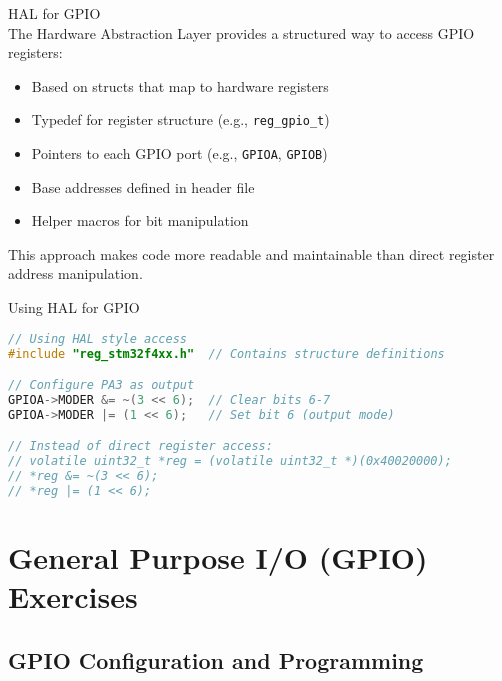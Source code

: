 \begin{concept}{HAL for GPIO}\\
The Hardware Abstraction Layer provides a structured way to access GPIO registers:
\begin{itemize}
    \item Based on structs that map to hardware registers
    \item Typedef for register structure (e.g., \texttt{reg\_gpio\_t})
    \item Pointers to each GPIO port (e.g., \texttt{GPIOA}, \texttt{GPIOB})
    \item Base addresses defined in header file
    \item Helper macros for bit manipulation
\end{itemize}
This approach makes code more readable and maintainable than direct register address manipulation.
\end{concept}

\begin{code}{Using HAL for GPIO}
\begin{lstlisting}[language=C, style=basesmol] 
// Using HAL style access
#include "reg_stm32f4xx.h"  // Contains structure definitions

// Configure PA3 as output
GPIOA->MODER &= ~(3 << 6);  // Clear bits 6-7
GPIOA->MODER |= (1 << 6);   // Set bit 6 (output mode)

// Instead of direct register access:
// volatile uint32_t *reg = (volatile uint32_t *)(0x40020000);
// *reg &= ~(3 << 6);
// *reg |= (1 << 6);
\end{lstlisting}
\end{code}

\section{General Purpose I/O (GPIO) Exercises}

\subsection{GPIO Configuration and Programming}

